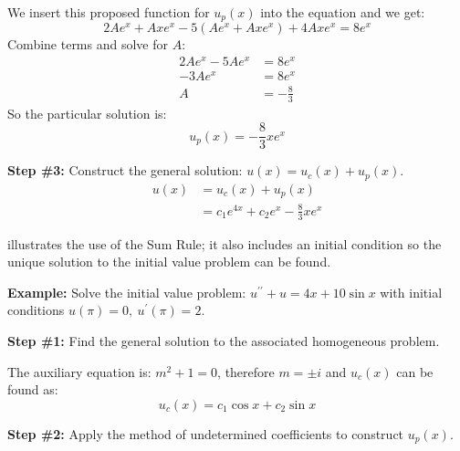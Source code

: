 \noindent We insert this proposed function for $u_p(x)$ into the equation and we get:
\begin{equation*}
2Ae^x+Axe^x - 5(Ae^x+Axe^x) + 4Axe^x = 8e^x
\end{equation*} 
Combine terms and solve for $A$:
\begin{align*}
2Ae^x-5Ae^x &= 8e^x \\
-3Ae^x &= 8e^x \\
A &= -\frac{8}{3}
\end{align*}
So the particular solution is:
\begin{equation*}
u_p(x) = -\frac{8}{3}xe^x
\end{equation*}

\vspace{0.25cm}
\noindent\textbf{Step \#3:} Construct the general solution: $u(x)=u_c(x)+u_p(x)$.
\begin{align*}
u(x) &= u_c(x)+u_p(x) \\
&=c_1e^{4x}+c_2e^x - \frac{8}{3}xe^{x}
\end{align*}

 illustrates the use of the Sum Rule; it also includes an initial condition so the unique solution to the initial value problem can be found.

\vspace{0.25cm}

\noindent\textbf{Example:} Solve the initial value problem: $u^{\prime \prime}+u=4x+10\sin{x}$ with initial conditions $u(\pi)=0, \ u^{\prime}(\pi)=2$.

\vspace{3.25cm}

\noindent\textbf{Step \#1:} Find the general solution to the associated homogeneous problem.

\vspace{0.25cm}

\noindent The auxiliary equation is: $m^2+1=0$, therefore $m=\pm i$ and $u_c(x)$ can be found as:
\begin{equation*}
u_c(x) = c_1\cos{x}+c_2\sin{x}
\end{equation*}

\vspace{0.25cm}

\noindent\textbf{Step \#2:} Apply the method of undetermined coefficients to construct $u_p(x)$.

